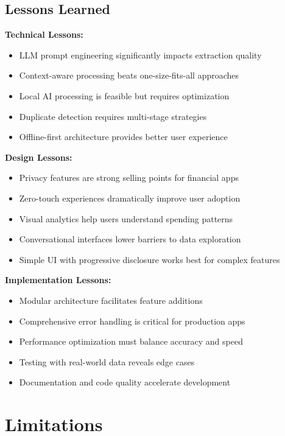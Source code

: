 \documentclass[11pt,a4paper]{report}
\begin{document}
\begin{itemize}
\begin{itemize}
\subsection{Lessons Learned}

\textbf{Technical Lessons:}
\begin{itemize}
    \item LLM prompt engineering significantly impacts extraction quality
    \item Context-aware processing beats one-size-fits-all approaches
    \item Local AI processing is feasible but requires optimization
    \item Duplicate detection requires multi-stage strategies
    \item Offline-first architecture provides better user experience
\end{itemize}

\textbf{Design Lessons:}
\begin{itemize}
    \item Privacy features are strong selling points for financial apps
    \item Zero-touch experiences dramatically improve user adoption
    \item Visual analytics help users understand spending patterns
    \item Conversational interfaces lower barriers to data exploration
    \item Simple UI with progressive disclosure works best for complex features
\end{itemize}

\textbf{Implementation Lessons:}
\begin{itemize}
    \item Modular architecture facilitates feature additions
    \item Comprehensive error handling is critical for production apps
    \item Performance optimization must balance accuracy and speed
    \item Testing with real-world data reveals edge cases
    \item Documentation and code quality accelerate development
\end{itemize}

\section{Limitations}


\end{itemize}
\end{itemize}
\end{document}
